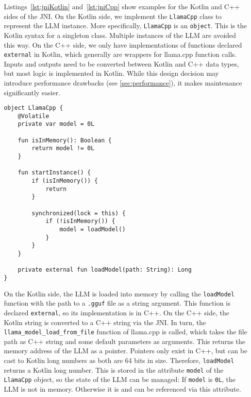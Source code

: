 Listings~\ref{lst:jniKotlin} and~\ref{lst:jniCpp} show examples for the Kotlin and C++ sides of the \gls{JNI}. On the Kotlin side, we implement the \lstinline|LlamaCpp| class to represent the \gls{LLM} instance. More specifically, \lstinline|LlamaCpp| is an \lstinline|object|. This is the Kotlin syntax for a singleton class. Multiple instances of the \gls{LLM} are avoided this way. On the C++ side, we only have implementations of functions declared \lstinline|external| in Kotlin, which generally are wrappers for llama.cpp function calls. Inputs and outputs need to be converted between Kotlin and C++ data types, but most logic is implemented in Kotlin. While this design decision may introduce performance drawbacks (see \cref{sec:performance}), it makes maintenance significantly easier.

\vspace{0.25cm}

\begin{lstlisting}[caption={[JNI: Kotlin side]{Example for the Kotlin side of the \gls{JNI}: State management for the \gls{LLM} using a function declared \lstinline|external| at the end.}}, label={lst:jniKotlin}]
object LlamaCpp {
    @Volatile
    private var model = 0L

    fun isInMemory(): Boolean {
        return model != 0L
    }

    fun startInstance() {
        if (isInMemory()) {
            return
        }

        synchronized(lock = this) {
            if (!isInMemory()) {
                model = loadModel()
            }
        }
    }

    private external fun loadModel(path: String): Long
}
\end{lstlisting}

On the Kotlin side, the \gls{LLM} is loaded into memory by calling the \lstinline|loadModel| function with the path to a \lstinline|.gguf| file as a string argument. This function is declared \lstinline|external|, so its implementation is in C++. On the C++ side, the Kotlin string is converted to a C++ string via the \gls{JNI}. In turn, the \lstinline|llama_model_load_from_file| function of llama.cpp is called, which takes the file path as C++ string and some default parameters as arguments. This returns the memory address of the \gls{LLM} as a pointer. Pointers only exist in C++, but can be cast to Kotlin long numbers as both are 64 bits in size. Therefore, \lstinline|loadModel| returns a Kotlin long number. This is stored in the attribute \lstinline|model| of the \lstinline|LlamaCpp| object, so the state of the \gls{LLM} can be managed: If \lstinline|model| is \lstinline|0L|, the \gls{LLM} is not in memory. Otherwise it is and can be referenced via this attribute.

